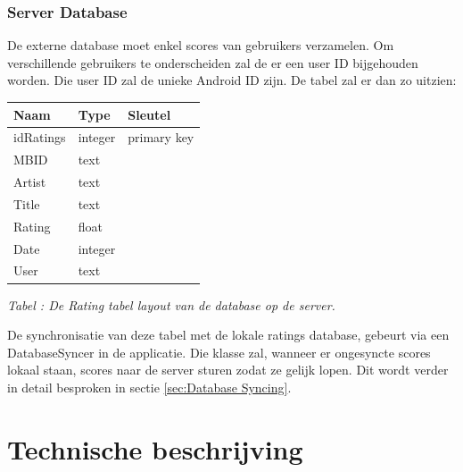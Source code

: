 \documentclass[11pt,a4paper]{article}
\newcounter{tabc}
\newcommand{\tabID} {%
   \stepcounter{tabc}%
   \thetabc}
\begin{document}
\newpage
	\subsubsection{Server Database}
	\label{sec:Server Database}
	\label{sec:Extdb}
	De externe database moet enkel scores van gebruikers verzamelen. Om verschillende gebruikers te onderscheiden zal de er een user ID bijgehouden worden. Die user ID zal de unieke Android ID zijn. De tabel zal er dan zo uitzien: \\ \newline
		\begin{tabular}{| l | l | l | }
		\hline
		 Naam		& Type		& Sleutel		\\
		 \hline 
		 idRatings 	& integer 	& primary key 	\\
		 MBID 		& text 		& 				\\
		 Artist		& text 		& 				\\
		 Title 		& text 		& 				\\
		 Rating		& float 	& 				\\
		 Date 		& integer 	& 				\\
		 User		& text 		& 				\\
		\hline
		\end{tabular}
		\label{tab:extDB}
	
	\small \textit{Tabel \tabID : De Rating tabel layout van de database op de server.} \\ \normalsize
		
	De synchronisatie van deze tabel met de lokale ratings database, gebeurt via een DatabaseSyncer in de applicatie. Die klasse zal, wanneer er ongesyncte scores lokaal staan, scores naar de server sturen zodat ze gelijk lopen. Dit wordt verder in detail besproken in sectie \ref{sec:Database Syncing}.
	
\newpage %

	
	
\newpage %
\section{Technische beschrijving}
\label{sec:Technisch}
\end{document}
